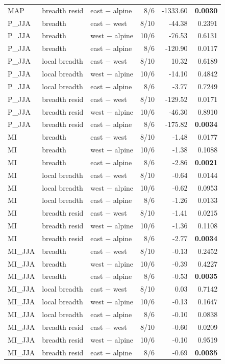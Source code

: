 {\begin{longtable}{lllrrr}
MAP & breadth resid & east $-$ alpine & 8/6 & -1333.60 & \textbf{0.0030} \\
P_JJA & breadth & east $-$ west & 8/10 & -44.38 & 0.2391 \\
P_JJA & breadth & west $-$ alpine & 10/6 & -76.53 & 0.6131 \\
P_JJA & breadth & east $-$ alpine & 8/6 & -120.90 & 0.0117 \\
P_JJA & local breadth & east $-$ west & 8/10 & 10.32 & 0.6189 \\
P_JJA & local breadth & west $-$ alpine & 10/6 & -14.10 & 0.4842 \\
P_JJA & local breadth & east $-$ alpine & 8/6 & -3.77 & 0.7249 \\
P_JJA & breadth resid & east $-$ west & 8/10 & -129.52 & 0.0171 \\
P_JJA & breadth resid & west $-$ alpine & 10/6 & -46.30 & 0.8910 \\
P_JJA & breadth resid & east $-$ alpine & 8/6 & -175.82 & \textbf{0.0034} \\
MI & breadth & east $-$ west & 8/10 & -1.48 & 0.0177 \\
MI & breadth & west $-$ alpine & 10/6 & -1.38 & 0.1088 \\
MI & breadth & east $-$ alpine & 8/6 & -2.86 & \textbf{0.0021} \\
MI & local breadth & east $-$ west & 8/10 & -0.64 & 0.0144 \\
MI & local breadth & west $-$ alpine & 10/6 & -0.62 & 0.0953 \\
MI & local breadth & east $-$ alpine & 8/6 & -1.26 & 0.0133 \\
MI & breadth resid & east $-$ west & 8/10 & -1.41 & 0.0215 \\
MI & breadth resid & west $-$ alpine & 10/6 & -1.36 & 0.1108 \\
MI & breadth resid & east $-$ alpine & 8/6 & -2.77 & \textbf{0.0034} \\
MI_JJA & breadth & east $-$ west & 8/10 & -0.13 & 0.2452 \\
MI_JJA & breadth & west $-$ alpine & 10/6 & -0.39 & 0.4227 \\
MI_JJA & breadth & east $-$ alpine & 8/6 & -0.53 & \textbf{0.0035} \\
MI_JJA & local breadth & east $-$ west & 8/10 & 0.03 & 0.7142 \\
MI_JJA & local breadth & west $-$ alpine & 10/6 & -0.13 & 0.1647 \\
MI_JJA & local breadth & east $-$ alpine & 8/6 & -0.10 & 0.0838 \\
MI_JJA & breadth resid & east $-$ west & 8/10 & -0.60 & 0.0209 \\
MI_JJA & breadth resid & west $-$ alpine & 10/6 & -0.10 & 0.9519 \\
MI_JJA & breadth resid & east $-$ alpine & 8/6 & -0.69 & \textbf{0.0035} \\
\end{longtable}
}
